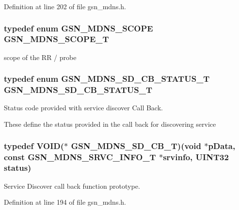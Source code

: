 Definition at line 202 of file gsn\_\-mdns.h.

\hypertarget{a00668_ga628a2f0345628c6bb12ee21fee3790db}{
\subsubsection[{GSN\_\-MDNS\_\-SCOPE\_\-T}]{\setlength{\rightskip}{0pt plus 5cm}typedef enum {\bf GSN\_\-MDNS\_\-SCOPE} {\bf GSN\_\-MDNS\_\-SCOPE\_\-T}}}
\label{a00668_ga628a2f0345628c6bb12ee21fee3790db}


scope of the RR / probe 

\hypertarget{a00668_ga81d8695cbcffd3e0d102ef17d1981938}{
\subsubsection[{GSN\_\-MDNS\_\-SD\_\-CB\_\-STATUS\_\-T}]{\setlength{\rightskip}{0pt plus 5cm}typedef enum {\bf GSN\_\-MDNS\_\-SD\_\-CB\_\-STATUS\_\-T} {\bf GSN\_\-MDNS\_\-SD\_\-CB\_\-STATUS\_\-T}}}
\label{a00668_ga81d8695cbcffd3e0d102ef17d1981938}


Status code provided with service discover Call Back. 

These define the status provided in the call back for discovering service \hypertarget{a00668_gaef8391be45a1399b7895289b3b56d632}{
\subsubsection[{GSN\_\-MDNS\_\-SD\_\-CB\_\-T}]{\setlength{\rightskip}{0pt plus 5cm}typedef VOID($\ast$ {\bf GSN\_\-MDNS\_\-SD\_\-CB\_\-T})(void $\ast$pData, const {\bf GSN\_\-MDNS\_\-SRVC\_\-INFO\_\-T} $\ast$srvinfo, {\bf UINT32} status)}}
\label{a00668_gaef8391be45a1399b7895289b3b56d632}


Service Discover call back function prototype. 



Definition at line 194 of file gsn\_\-mdns.h.

